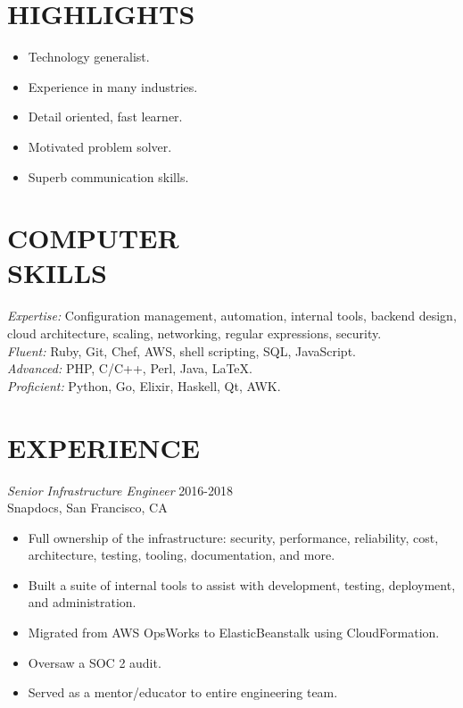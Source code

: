 \documentclass[line,margin]{res}
\begin{document}
\address{\,\,\,\,\,\,\,\,\,\,\,\,\,\,\,\,\,\,\,\,\, dana.merrick@gmail.com}
\address{USA-based -- 978.206.1331}

\begin{resume}

\section{HIGHLIGHTS}
  \begin{itemize}  \itemsep -2pt %
    \item Technology generalist.
    \item Experience in many industries.
    \item Detail oriented, fast learner.
    \item Motivated problem solver.
    \item Superb communication skills.
  \end{itemize}
  
\section{COMPUTER \\ SKILLS}
  {\sl Expertise:}
  Configuration management,
  automation,
  internal tools,
  backend design,
  cloud architecture,
  scaling,
  networking,
  regular expressions,
  security.
  \\
  {\sl Fluent:}
  Ruby,
  Git,
  Chef,
  AWS,
  shell scripting,
  SQL,
  JavaScript.
  \\
  {\sl Advanced:}
  PHP,
  C/C++,
  Perl,
  Java,
  \LaTeX.
  \\
  {\sl Proficient:}
  Python,
  Go,
  Elixir,
  Haskell,
  Qt,
  AWK.


\section{EXPERIENCE}
  {\sl Senior Infrastructure Engineer}  \hfill 2016-2018 \\
  Snapdocs,
  San Francisco, CA
  \begin{itemize}  \itemsep -2pt %
    \item Full ownership of the infrastructure: security, performance, reliability, cost, architecture, testing, tooling, documentation, and more.
    \item Built a suite of internal tools to assist with development, testing, deployment, and administration.
    \item Migrated from AWS OpsWorks to ElasticBeanstalk using CloudFormation.
    \item Oversaw a SOC 2 audit.
    \item Served as a mentor/educator to entire engineering team.
  \end{itemize}


\end{resume}
\end{document}
